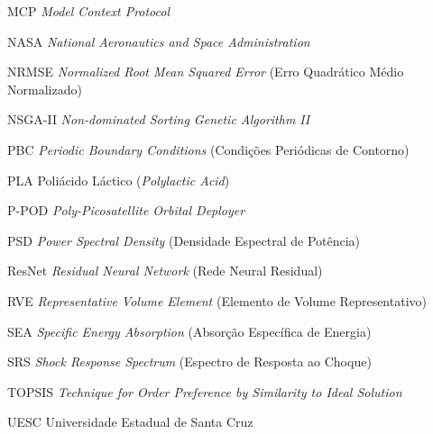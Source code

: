 \begin{siglas}
  \item[MCP] \textit{Model Context Protocol}
  \item[NASA] \textit{National Aeronautics and Space Administration}
  \item[NRMSE] \textit{Normalized Root Mean Squared Error} (Erro Quadrático Médio Normalizado)
  \item[NSGA-II] \textit{Non-dominated Sorting Genetic Algorithm II}
  \item[PBC] \textit{Periodic Boundary Conditions} (Condições Periódicas de Contorno)
  \item[PLA] Poliácido Láctico (\textit{Polylactic Acid})
  \item[P-POD] \textit{Poly-Picosatellite Orbital Deployer}
  \item[PSD] \textit{Power Spectral Density} (Densidade Espectral de Potência)
  \item[ResNet] \textit{Residual Neural Network} (Rede Neural Residual)
  \item[RVE] \textit{Representative Volume Element} (Elemento de Volume Representativo)
  \item[SEA] \textit{Specific Energy Absorption} (Absorção Específica de Energia)
  \item[SRS] \textit{Shock Response Spectrum} (Espectro de Resposta ao Choque)
  \item[TOPSIS] \textit{Technique for Order Preference by Similarity to Ideal Solution}
  \item[UESC] Universidade Estadual de Santa Cruz
\end{siglas}
